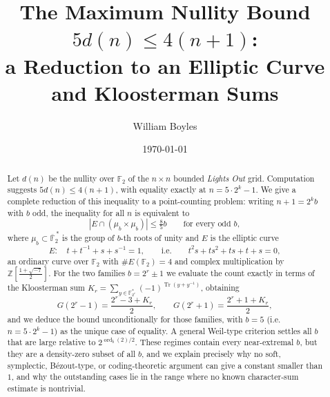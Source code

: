 \documentclass[a4paper]{article}
\theoremstyle{definition}
\newcommand{\Z}{\mathbb{Z}}
\newcommand{\F}{\mathbb{F}}
\newcommand{\abs}[1]{\left| #1 \right|}
\newcommand{\Tr}{\operatorname{Tr}}
\begin{document}
	\title{The Maximum Nullity Bound $5d(n) \leq 4(n+1)$:\\ a Reduction to an Elliptic Curve and Kloosterman Sums}
	\author{William Boyles}
	\date{\today}
	\maketitle

	\begin{abstract}
		Let $d(n)$ be the nullity over $\F_2$ of the $n \times n$ bounded \textit{Lights Out} grid.
		Computation suggests $5d(n) \leq 4(n+1)$, with equality exactly at $n = 5 \cdot 2^k - 1$.
		We give a complete reduction of this inequality to a point-counting problem: writing $n + 1 = 2^k b$ with $b$ odd, the inequality for all $n$ is equivalent to
		\begin{equation*}
			\abs{E \cap (\mu_b \times \mu_b)} \leq \tfrac{8}{5} b \qquad \text{for every odd } b,
		\end{equation*}
		where $\mu_b \subset \overline{\F}_2^{\,*}$ is the group of $b$-th roots of unity and $E$ is the elliptic curve
		\begin{equation*}
			E : \quad t + t^{-1} + s + s^{-1} = 1, \qquad\text{i.e.}\qquad t^2 s + t s^2 + ts + t + s = 0,
		\end{equation*}
		an ordinary curve over $\F_2$ with $\#E(\F_2) = 4$ and complex multiplication by $\Z\left[\frac{1 + \sqrt{-7}}{2}\right]$.
		For the two families $b = 2^r \pm 1$ we evaluate the count exactly in terms of the Kloosterman sum $K_r = \sum_{y \in \F_{2^r}^*} (-1)^{\Tr(y + y^{-1})}$, obtaining
		\begin{equation*}
			G(2^r - 1) = \frac{2^r - 3 + K_r}{2}, \qquad G(2^r + 1) = \frac{2^r + 1 + K_r}{2},
		\end{equation*}
		and we deduce the bound unconditionally for those families, with $b = 5$ (i.e.\ $n = 5 \cdot 2^k - 1$) as the unique case of equality.
		A general Weil-type criterion settles all $b$ that are large relative to $2^{\operatorname{ord}_b(2)/2}$.
		These regimes contain every near-extremal $b$, but they are a density-zero subset of all $b$, and we explain precisely why no soft, symplectic, Bézout-type, or coding-theoretic argument can give a constant smaller than $1$, and why the outstanding cases lie in the range where no known character-sum estimate is nontrivial.
	\end{abstract}
\end{document}
